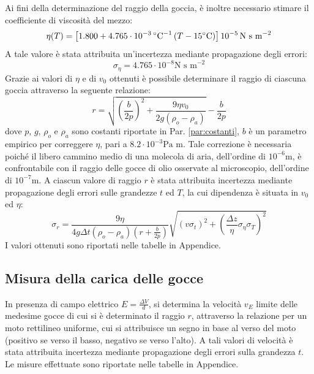 \documentclass[]{article}
\let\oldsubsection\subsection%
\renewcommand{\subsection}{%
	\renewcommand{\theequation}{\thesubsection.\arabic{equation}}%
	\oldsubsection}%
\begin{document}
    Ai fini della determinazione del raggio della goccia, è inoltre necessario stimare il coefficiente di viscosità del mezzo:
    \begin{equation}
        \label{viscosita}
        \eta(T) = \left[ 1.800 + 4.765 \cdot 10^{-3} \, \degree \text{C}^{-1} \left( T - 15 \degree \text{C} \right) \right] 10^{-5} \,\text{N s m}^{-2}  
    \end{equation}
    A tale valore è stata attribuita un'incertezza mediante propagazione degli errori:
    \begin{equation}
        \label{sigma-eta}
        \sigma_{\eta}= 4.765 \cdot 10^{-8} \text{N s m}^{-2}
    \end{equation}
    Grazie ai valori di $\eta$ e di $v_0$ ottenuti è possibile determinare il raggio di ciascuna goccia attraverso la seguente relazione:
    \begin{equation}
        \label{raggio}
        r = \sqrt{\left( \frac{b}{2p} \right)^2 + \frac{9 \eta v_0}{2g \left( \rho_{o} - \rho_a\right)}} - \frac{b}{2p}
    \end{equation}
    dove $p$, $g$, $\rho_o$ e $\rho_a$ sono costanti riportate in Par. \ref{par:costanti}, $b$ è un parametro empirico per correggere $\eta$, pari a $8.2 \cdot 10^{-3} \text{Pa m}$. Tale correzione è necessaria poiché il libero cammino medio di una molecola di aria, dell'ordine di $10^{-6} \text{m}$, è confrontabile con il raggio delle gocce di olio osservate al microscopio, dell'ordine di $10^{-7} \text{m}$.
    A ciascun valore di raggio $r$ è stata attribuita incertezza mediante propagazione degli errori sulle grandezze $t$ ed $T$, la cui dipendenza è situata in $v_0$ ed $\eta$:
    \begin{equation}
        \sigma_r= \frac{9 \eta}{ 4 g \Delta t \left(\rho_o - \rho_a \right) \left(r+\frac{b}{2p} \right)} \sqrt{ \left(v \sigma_t\right)^2 + \left( \frac{\Delta z}{\eta} \sigma_{\eta} \sigma_T \right)^2}
    \end{equation}
    I valori ottenuti sono riportati nelle tabelle in Appendice.

    \subsection{Misura della carica delle gocce}
    \label{par:cariche-olio}
    In presenza di campo elettrico $E = \frac{\Delta V}{d}$, si determina la velocità $v_E$ limite delle medesime gocce di cui si è determinato il raggio $r$, attraverso la relazione per un moto rettilineo uniforme, cui si attribuisce un segno in base al verso del moto (positivo se verso il basso, negativo se verso l'alto). A tali valori di velocità è stata attribuita incertezza mediante propagazione degli errori sulla grandezza $t$. \\
    Le misure effettuate sono riportate nelle tabelle in Appendice.
    
\end{document}
